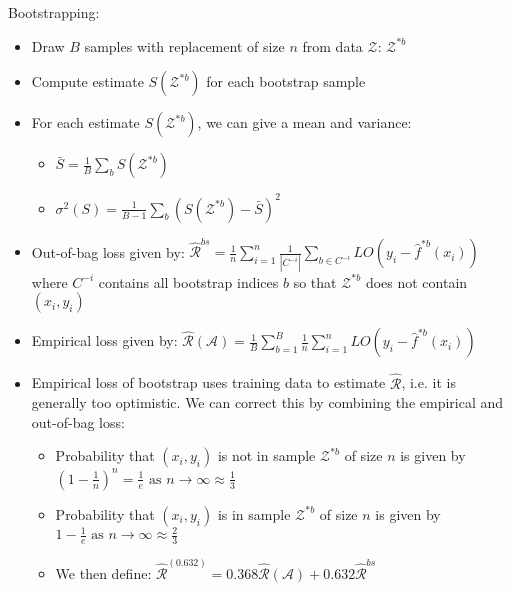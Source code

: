 Bootstrapping:
\begin{itemize}
    \item Draw $B$ samples with replacement of size $n$ from data $\mathcal{Z}$: $\mathcal{Z}^{*b}$
    \item Compute estimate $S( \mathcal{Z}^{*b} )$ for each bootstrap sample
    \item For each estimate $S( \mathcal{Z}^{*b} )$, we can give a mean and variance:
    \begin{itemize}
        \item $\bar{S} = \frac{1}{B} \sum_b S( \mathcal{Z}^{*b} )$
        \item $\sigma^2(S) = \frac{1}{B-1} \sum_b ( S( \mathcal{Z}^{*b} ) - \bar{S})^2$
    \end{itemize}
    \item Out-of-bag loss given by: $\hat{\mathcal{R}}^{bs} = \frac{1}{n} \sum_{i=1}^n \frac{1}{| C^{-i} |} \sum_{b \in C^{-i}} LO(y_i - \hat{f}^{*b} (x_i))$ where $C^{-i}$ contains all bootstrap indices $b$ so that $\mathcal{Z}^{*b}$ does not contain $(x_i,y_i)$
    \item Empirical loss given by: $\hat{\mathcal{R}}(\mathcal{A}) = \frac{1}{B} \sum_{b=1}^B \frac{1}{n} \sum_{i=1}^n LO(y_i - \hat{f}^{*b} (x_i))$ 
    \item Empirical loss of bootstrap uses training data to estimate $\hat{\mathcal{R}}$, i.e. it is generally too optimistic. We can correct this by combining the empirical and out-of-bag loss:
    \begin{itemize}
        \item Probability that $(x_i,y_i)$ is not in sample $\mathcal{Z}^{*b}$ of size $n$ is given by $(1-\frac{1}{n})^n = \frac{1}{e} \textrm{ as } n \rightarrow \infty \approx \frac{1}{3}$
        \item Probability that $(x_i,y_i)$ is in sample $\mathcal{Z}^{*b}$ of size $n$ is given by $1 - \frac{1}{e} \textrm{ as } n \rightarrow \infty \approx \frac{2}{3}$
        \item We then define: $\hat{\mathcal{R}}^{(0.632)} = 0.368 \hat{\mathcal{R}}(\mathcal{A}) + 0.632 \hat{\mathcal{R}}^{bs}$
    \end{itemize}
\end{itemize}